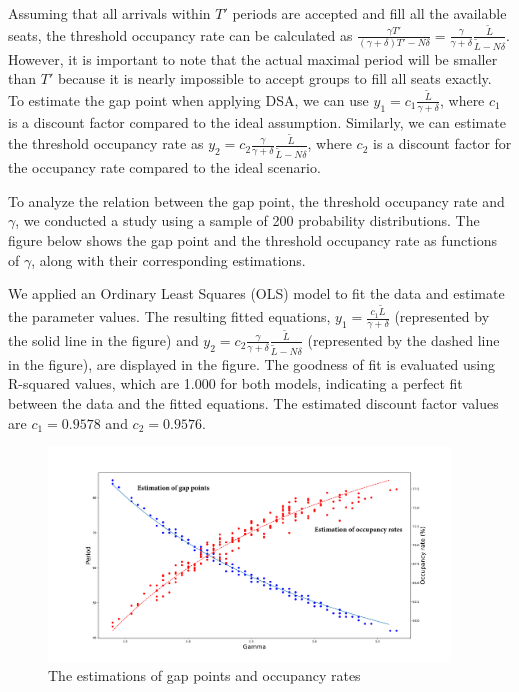 Assuming that all arrivals within $T'$ periods are accepted and fill all the available seats, the threshold occupancy rate can be calculated as $\frac{\gamma T'}{(\gamma+ \delta)T' - N \delta} = \frac{\gamma}{\gamma +\delta} \frac{\tilde{L}}{\tilde{L}-N \delta}$. However, it is important to note that the actual maximal period will be smaller than $T{'}$ because it is nearly impossible to accept groups to fill all seats exactly. To estimate the gap point when applying DSA, we can use $y_1 = c_1 \frac{\tilde{L}}{\gamma + \delta}$, where $c_1$ is a discount factor compared to the ideal assumption. Similarly, we can estimate the threshold occupancy rate as $y_2 = c_2 \frac{\gamma}{\gamma +\delta} \frac{\tilde{L}}{\tilde{L}-N \delta}$, where $c_2$ is a discount factor for the occupancy rate compared to the ideal scenario.

To analyze the relation between the gap point, the threshold occupancy rate and $\gamma$, we conducted a study using a sample of 200 probability distributions. The figure below shows the gap point and the threshold occupancy rate as functions of $\gamma$, along with their corresponding estimations.

We applied an Ordinary Least Squares (OLS) model to fit the data and estimate the parameter values. The resulting fitted equations, $y_1 = \frac{c_1 \tilde{L}}{\gamma + \delta}$ (represented by the solid line in the figure) and $y_2 = c_2 \frac{\gamma}{\gamma + \delta} \frac{\tilde{L}}{\tilde{L}-N \delta}$ (represented by the dashed line in the figure), are displayed in the figure. The goodness of fit is evaluated using R-squared values, which are 1.000 for both models, indicating a perfect fit between the data and the fitted equations. The estimated discount factor values are $c_1 = 0.9578$ and $c_2 = 0.9576$.

\begin{figure}[ht]
  \centering
    \includegraphics[width=0.95\textwidth]{./Figures/200_random.pdf}
  \caption{The estimations of gap points and occupancy rates}
\end{figure}


